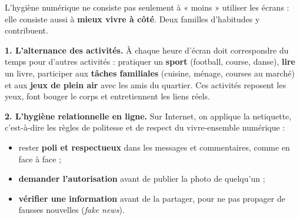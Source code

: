 \documentclass[11pt]{article}
\newcommand{\cle}[1]{{\popxbold\color{popdark}#1}}
\begin{document}
L'hygiène numérique ne consiste pas seulement à « moins » utiliser les écrans : elle consiste aussi à \textbf{mieux vivre à côté}. Deux familles d'habitudes y contribuent.

\textbf{1. L'alternance des activités.} À chaque heure d'écran doit correspondre du temps pour d'autres activités : pratiquer un \textbf{sport} (football, course, danse), \textbf{lire} un livre, participer aux \textbf{tâches familiales} (cuisine, ménage, courses au marché) et aux \textbf{jeux de plein air} avec les amis du quartier. Ces activités reposent les yeux, font bouger le corps et entretiennent les liens réels.

\textbf{2. L'hygiène relationnelle en ligne.} Sur Internet, on applique la \cle{netiquette}, c'est-à-dire les règles de politesse et de respect du vivre-ensemble numérique :
\begin{itemize}
  \item rester \textbf{poli et respectueux} dans les messages et commentaires, comme en face à face ;
  \item \textbf{demander l'autorisation} avant de publier la photo de quelqu'un ;
  \item \textbf{vérifier une information} avant de la partager, pour ne pas propager de fausses nouvelles (\emph{fake news}).
\end{itemize}
\end{document}
